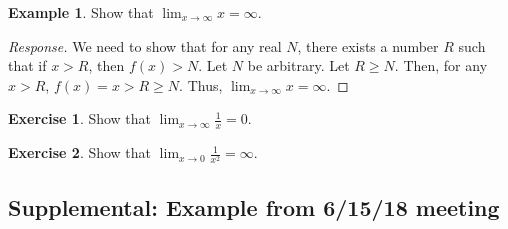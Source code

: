 \documentclass[english]{book}
\theoremstyle{remark}
\theoremstyle{definition}
\newtheorem{excs}{Exercise}
\newtheorem{exle}[theorem]{Example}
\newtheorem*{next week}{Next Week}
\newcommand{\dlim}{\displaystyle\lim}
\begin{document}
\begin{exle}
	Show that $\dlim_{x\to \infty} x=\infty$.
\end{exle}
\begin{proof}[Response]
	We need to show that for any real $N$, there exists a number $R$ such that if $x>R$, then $f(x)>N$. Let $N$ be arbitrary. Let $R\geq N$. Then, for any $x>R$, $f(x)=x>R\geq N$. Thus, $\lim_{x\to \infty}x=\infty$. 
\end{proof}
\begin{excs}
	Show that $\dlim_{x\to \infty} \frac{1}{x}=0$. 
\end{excs}
\begin{excs}Show that $\dlim_{x\to 0}\frac{1}{x^2}=\infty$. 
\end{excs}
\subsection{Supplemental: Example from 6/15/18 meeting}
\end{document}
